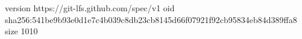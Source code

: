 version https://git-lfs.github.com/spec/v1
oid sha256:541be9b93e0d1e7c4b039c8db23cb8145d66f07921f92cb95834eb84d389ffa8
size 1010
